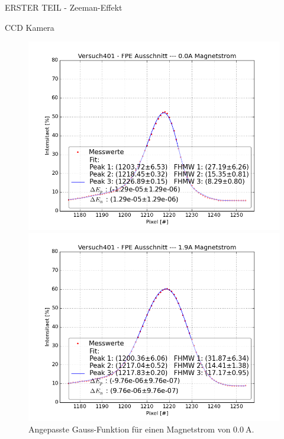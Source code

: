 \begin{appendix}
\begin{chapter}{ERSTER TEIL - Zeeman-Effekt}
\begin{section}{CCD Kamera}
      \begin{figure}[htbp!]
        \centering
        \begin{minipage}{0.48\textwidth}
          \centering
          \includegraphics[width=\textwidth]
        {Figures/Versuch401-FPEAusschnitt-0_0AMagnetstrom_Pixel_Intensitaet.png}
          \caption{Angepasste Gauss-Funktion für einen Magnetstrom von 
              $\SI{0.0}{\ampere}$.}
          \label{fig:AnhangZM00}
        \end{minipage} \quad
        \begin{minipage}{0.48\textwidth}
          \centering
          \includegraphics[width=\textwidth]
        {Figures/Versuch401-FPEAusschnitt-1_9AMagnetstrom_Pixel_Intensitaet.png}

\end{minipage}
\end{figure}
\end{section}
\end{chapter}
\end{appendix}
